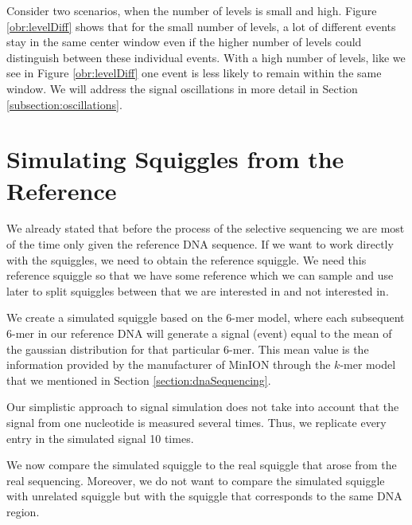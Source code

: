 Consider two scenarios, when the number of levels is small and high.
Figure \ref{obr:levelDiff} shows that for the small number of levels, a lot of
different events stay in the same center window even if the higher number of levels
could distinguish between these individual events. With a high number of levels,
like we see in Figure \ref{obr:levelDiff} one event is less likely to remain within the same window.
We will address the signal oscillations in more detail in Section \ref{subsection:oscillations}.

\section{Simulating Squiggles from the Reference}

We already stated that before the process of the selective sequencing we are most
of the time only given the reference DNA sequence. If we want to work directly with the squiggles,
we need to obtain the reference squiggle. We need this reference squiggle
so that we have some reference which we can sample and use later to split squiggles
between that we are interested in and not interested in.

We create a simulated squiggle based on the 6-mer model,
where each subsequent 6-mer in our reference DNA will generate a signal (event) equal to
the mean of the gaussian distribution for that particular 6-mer. This mean value
is the information provided by the manufacturer of MinION through the $k$-mer model
that we mentioned in Section \ref{section:dnaSequencing}.

Our simplistic approach to signal simulation does not take into account that the
signal from one nucleotide is measured several times. Thus, we replicate every entry in the simulated signal
10 times.

We now compare the simulated squiggle to the real squiggle that arose from the real
sequencing. Moreover, we do not want to compare the simulated squiggle with unrelated squiggle
but with the squiggle that corresponds to the same DNA region.

